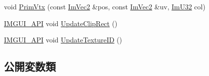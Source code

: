 \begin{DoxyCompactItemize}
void \mbox{\hyperlink{struct_im_draw_list_a405377158f0028ad8b4fb6509eef4532}{Prim\+Vtx}} (const \mbox{\hyperlink{struct_im_vec2}{Im\+Vec2}} \&pos, const \mbox{\hyperlink{struct_im_vec2}{Im\+Vec2}} \&uv, \mbox{\hyperlink{imgui_8h_a118cff4eeb8d00e7d07ce3d6460eed36}{Im\+U32}} col)
\item 
\mbox{\hyperlink{imgui_8h_a43829975e84e45d1149597467a14bbf5}{I\+M\+G\+U\+I\+\_\+\+A\+PI}} void \mbox{\hyperlink{struct_im_draw_list_a5978db1fc49be781978699e85c6a3251}{Update\+Clip\+Rect}} ()
\item 
\mbox{\hyperlink{imgui_8h_a43829975e84e45d1149597467a14bbf5}{I\+M\+G\+U\+I\+\_\+\+A\+PI}} void \mbox{\hyperlink{struct_im_draw_list_a58998853ed37538ae5a638da032b0005}{Update\+Texture\+ID}} ()
\end{DoxyCompactItemize}
\subsection*{公開変数類}
